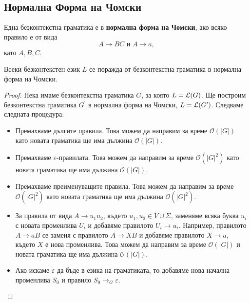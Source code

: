 \subsection{Нормална Форма на Чомски}
Една безконтекстна граматика е в {\bf нормална форма на Чомски}, ако
всяко правило е от вида
\[A \rightarrow BC\mbox{ и }A \rightarrow a,\]
като $A, B, C$.

\begin{framed}
  \begin{theorem}
    Всеки безконтекстен език $L$ се поражда от безконтекстна граматика в нормална форма на Чомски.
  \end{theorem}
\end{framed}
\begin{proof}
  Нека имаме безконтекстна граматика $G$, за която $L = \mathcal{L}(G)$.
  Ще построим безконтекстна граматика $G^\prime$ в нормална форма на Чомски, $L = \mathcal{L}(G^\prime)$.
  Следваме следната процедура:
  \begin{itemize}
  \item
    Премахваме дългите правила.
    Това можем да направим за време $\mathcal{O}(|G|)$
    като новата граматика ще има дължина $\mathcal{O}(|G|)$.
  \item
    Премахваме $\varepsilon$-правилата.
    Това можем да направим за време $\mathcal{O}(|G|^2)$
    като новата граматика ще има дължина $\mathcal{O}(|G|)$.
  \item
    Премахваме преименуващите правила.
    Това можем да направим за време $\mathcal{O}(|G|^2)$
    като новата граматика ще има дължина $\mathcal{O}(|G|^2)$.
  \item
    За правила от вида $A\to u_1 u_2$, където $u_1, u_2 \in V \cup \Sigma$, 
    заменяме всяка буква $u_i$ с новата променлива $U_i$
    и добавяме правилото $U_i\to u_i$.
    Например, правилото $A \to aB$ се заменя с правилото $A \to XB$ и добавяме правилото $X \to a$,
    където $X$ е нова променлива.
    Това можем да направим за време $\mathcal{O}(|G|)$ и новата граматика ще има дължина $\mathcal{O}(|G|)$.
  \item
    Ако искаме $\varepsilon$ да бъде в езика на граматиката, то добавяме нова начална променлива $S_0$
    и правило $S_0 \to_G \varepsilon$.
  \end{itemize}
\end{proof}

